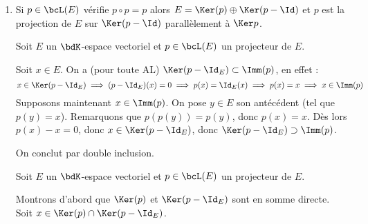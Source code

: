 \documentclass[a4paper,french,bookmarks]{article}
\begin{document}
\begin{enumerate}
    \item Si $p \in \bcL(E)$ vérifie $p \circ p = p$ alors $E = \Ker(p)
    \oplus \Ker(p - \Id)$ et $p$ est la projection de $E$ sur $\Ker(p -
    \Id)$ parallèlement à $\Ker p$.
    
    \noafter
    \nobefore
    \begin{nproof}
            Soit $E$ un $\bdK$-espace vectoriel et $p \in \bcL(E)$ un
            projecteur de $E$.
            
            \begin{enumerate}
                \itt Soit $x \in E$. On a (pour toute AL) $\Ker(p -
                \Id_E) \subset \Imm(p)$, en effet :
                \[ x \in \Ker(p - \Id_E) \implies (p - \Id_E)(x) = 0
                \implies p(x) = \Id_E(x) \implies p(x) = x \implies x
                \in \Imm(p)\]
                \itt Supposons maintenant $x \in \Imm(p)$.  On pose $y
                \in E$ son antécédent (tel que $p(y) = x$). Remarquons
                que $p(p(y)) = p(y)$, donc $p(x) = x$. Dès lors $p(x) -
                x = 0$, donc $x \in \Ker(p - \Id_E)$, donc $\Ker(p -
                \Id_E) \supset \Imm(p)$.
        \end{enumerate}
        
         On conclut par double inclusion.
    \end{nproof}

    \begin{nproof}
        Soit $E$ un $\bdK$-espace vectoriel et $p \in \bcL(E)$ un
        projecteur de $E$.
        
        \begin{enumerate}
            \itt Montrons d'abord que $\Ker(p)$ et $\Ker(p - \Id_E)$
            sont en somme directe. Soit $x \in \Ker(p) \cap \Ker(p -
            \Id_E)$.
            

\end{enumerate}
\end{nproof}
\end{enumerate}
\end{document}
